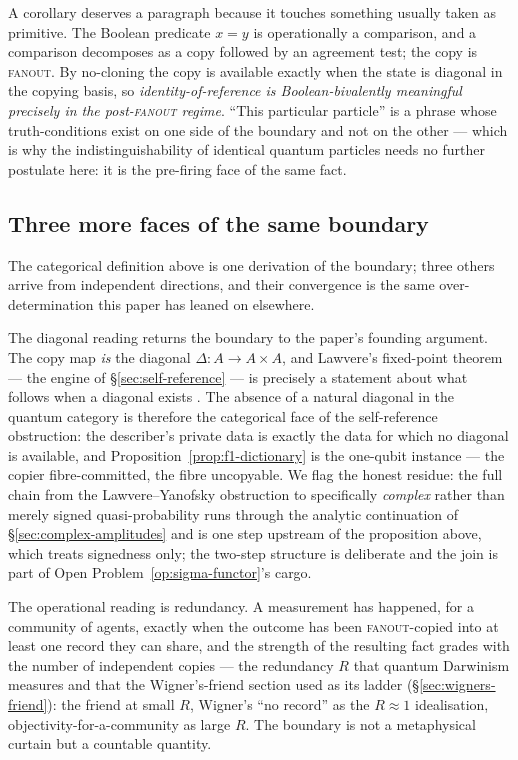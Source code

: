 A corollary deserves a paragraph because it touches something usually taken as primitive. The
Boolean predicate $x = y$ is operationally a comparison, and a comparison decomposes as a copy
followed by an agreement test; the copy is \textsc{fanout}. By no-cloning the copy is available
exactly when the state is diagonal in the copying basis, so \emph{identity-of-reference is
Boolean-bivalently meaningful precisely in the post-\textsc{fanout} regime}. ``This particular
particle'' is a phrase whose truth-conditions exist on one side of the boundary and not on the
other --- which is why the indistinguishability of identical quantum particles needs no further
postulate here: it is the pre-firing face of the same fact.

\subsection{Three more faces of the same boundary}

The categorical definition above is one derivation of the boundary; three others arrive from
independent directions, and their convergence is the same over-determination this paper has leaned
on elsewhere.

The diagonal reading returns the boundary to the paper's founding argument. The copy map \emph{is}
the diagonal $\Delta: A \to A \times A$, and Lawvere's fixed-point theorem --- the engine of
\S\ref{sec:self-reference} --- is precisely a statement about what follows when a diagonal exists
\autocite{Lawvere_1969, Yanofsky2003}. The absence of a natural diagonal in the quantum category is
therefore the categorical face of the self-reference obstruction: the describer's private data is
exactly the data for which no diagonal is available, and Proposition~\ref{prop:f1-dictionary} is
the one-qubit instance --- the copier fibre-committed, the fibre uncopyable. We flag the honest
residue: the full chain from the Lawvere--Yanofsky obstruction to specifically \emph{complex}
rather than merely signed quasi-probability runs through the analytic continuation of
\S\ref{sec:complex-amplitudes} and is one step upstream of the proposition above, which treats
signedness only; the two-step structure is deliberate and the join is part of
Open Problem~\ref{op:sigma-functor}'s cargo.

The operational reading is redundancy. A measurement has happened, for a community of agents,
exactly when the outcome has been \textsc{fanout}-copied into at least one record they can share,
and the strength of the resulting fact grades with the number of independent copies --- the
redundancy $R$ that quantum Darwinism measures \autocite{zurek_2009} and that the Wigner's-friend
section used as its ladder (\S\ref{sec:wigners-friend}): the friend at small $R$, Wigner's
``no record'' as the $R \approx 1$ idealisation, objectivity-for-a-community as large $R$. The
boundary is not a metaphysical curtain but a countable quantity.

